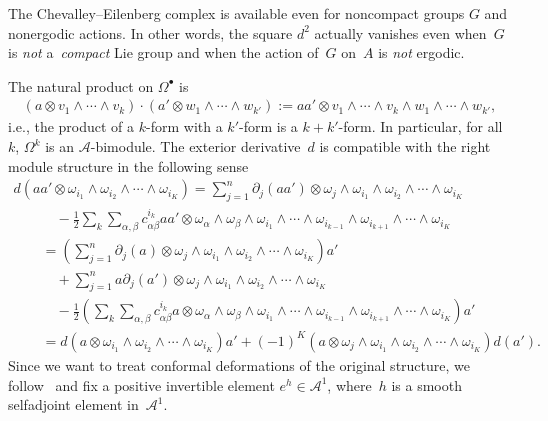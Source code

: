 \documentclass[11pt]{article}
\newcommand{\Aa}{\mathcal{A}}
\numberwithin{equation}{section}
\begin{document}
\begin{Remark}
The Chevalley--Eilenberg complex is available even for noncompact groups $G$ and nonergodic actions. In other words, the square $d^2$ actually vanishes even when~$G$ is \emph{not} a~\emph{compact} Lie group and when the action of~$G$ on~$A$ is \emph{not} ergodic.
\end{Remark}

The natural product on $\Omega^\bullet$ is
\begin{gather}
\label{Eqn:ProdOmega}
(a \otimes v_1 \wedge \cdots \wedge v_k) \cdot (a' \otimes w_{1} \wedge \cdots \wedge w_{k'}) := a a' \otimes v_1 \wedge \cdots \wedge v_k \wedge w_1 \wedge \cdots \wedge w_{k'},
\end{gather}
i.e., the product of a $k$-form with a $k'$-form is a $k+k'$-form. In particular, for all~$k$, $\Omega^k$ is an $\Aa$-bimodule. The exterior derivative~$d$ is compatible with the right module structure in the following sense
\begin{gather*}
d( a a'\otimes \omega_{i_1} \wedge \omega_{i_2} \wedge \cdots \wedge \omega_{i_K} ) =\sum_{j = 1}^n \partial _j(a a') \otimes \omega_j \wedge \omega_{i_1} \wedge \omega_{i_2} \wedge \cdots \wedge \omega_{i_K} \\
\qquad\quad{}
 - \frac{1}{2} \sum_{k} \sum_{\alpha, \beta} c^{i_k}_{\alpha \beta} a a'\otimes \omega_\alpha \wedge \omega_\beta \wedge \omega_{i_1} \wedge \cdots \wedge \omega_{i_{k-1}} \wedge \omega_{i_{k+1}} \wedge \cdots \wedge \omega_{i_K}
\\
\qquad{}= \left( \sum_{j = 1}^n \partial _j(a) \otimes \omega_j \wedge \omega_{i_1} \wedge \omega_{i_2} \wedge \cdots \wedge \omega_{i_K} \right) a' \\
\qquad\quad{}
+\sum_{j = 1}^n a\partial _j(a') \otimes \omega_j \wedge \omega_{i_1} \wedge \omega_{i_2} \wedge \cdots \wedge \omega_{i_K} \\
\qquad\quad{}
 - \frac{1}{2} \left( \sum_{k} \sum_{\alpha, \beta} c^{i_k}_{\alpha \beta} a \otimes \omega_\alpha \wedge \omega_\beta \wedge \omega_{i_1} \wedge \cdots \wedge \omega_{i_{k-1}} \wedge \omega_{i_{k+1}} \wedge \cdots \wedge \omega_{i_K} \right) a'
\\
\qquad{}
= d( a \otimes \omega_{i_1} \wedge \omega_{i_2} \wedge \cdots \wedge \omega_{i_K} ) a'
+(-1)^K (a \otimes \omega_j \wedge \omega_{i_1} \wedge \omega_{i_2} \wedge \cdots \wedge \omega_{i_K}) d(a').
\end{gather*}
Since we want to treat conformal deformations of the original structure, we follow~\cite{GaussBonnet-ConnesTretkoff} and f\/ix a positive invertible element $e^{h} \in \Aa^1$, where~$h$ is a smooth selfadjoint element in~$\Aa^1$.
\end{document}
